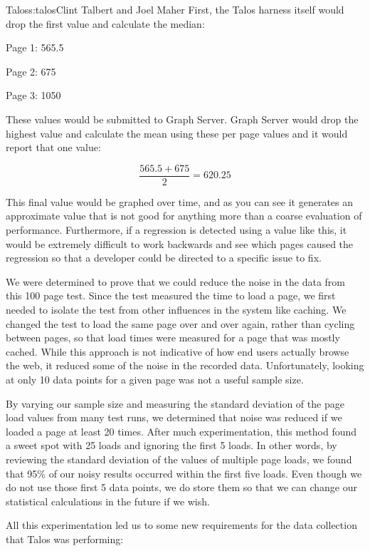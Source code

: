 \begin{aosachapter}{Talos}{s:talos}{Clint Talbert and Joel Maher}
\noindent First, the Talos harness itself would drop the first value and calculate
the median:

\begin{aosaitemize}

\item
  Page 1: 565.5
\item
  Page 2: 675
\item
  Page 3: 1050
\end{aosaitemize}

\noindent These values would be submitted to Graph Server. Graph Server would drop
the highest value and calculate the mean using these per page values and
it would report that one value:

\[ \frac{565.5 + 675}{2} = 620.25 \]

This final value would be graphed over time, and as you can see it
generates an approximate value that is not good for anything more than a
coarse evaluation of performance. Furthermore, if a regression is
detected using a value like this, it would be extremely difficult to
work backwards and see which pages caused the regression so that a
developer could be directed to a specific issue to fix.

We were determined to prove that we could reduce the noise in the data
from this 100 page test. Since the test measured the time to load a
page, we first needed to isolate the test from other influences in the
system like caching. We changed the test to load the same page over and
over again, rather than cycling between pages, so that load times were
measured for a page that was mostly cached. While this approach is not
indicative of how end users actually browse the web, it reduced some of
the noise in the recorded data. Unfortunately, looking at only 10 data
points for a given page was not a useful sample size.

By varying our sample size and measuring the standard deviation of the
page load values from many test runs, we determined that noise was
reduced if we loaded a page at least 20 times. After much
experimentation, this method found a sweet spot with 25 loads and
ignoring the first 5 loads. In other words, by reviewing the standard
deviation of the values of multiple page loads, we found that 95\% of
our noisy results occurred within the first five loads. Even though we
do not use those first 5 data points, we do store them so that we can
change our statistical calculations in the future if we wish.

All this experimentation led us to some new requirements for the data
collection that Talos was performing:


\end{aosachapter}
